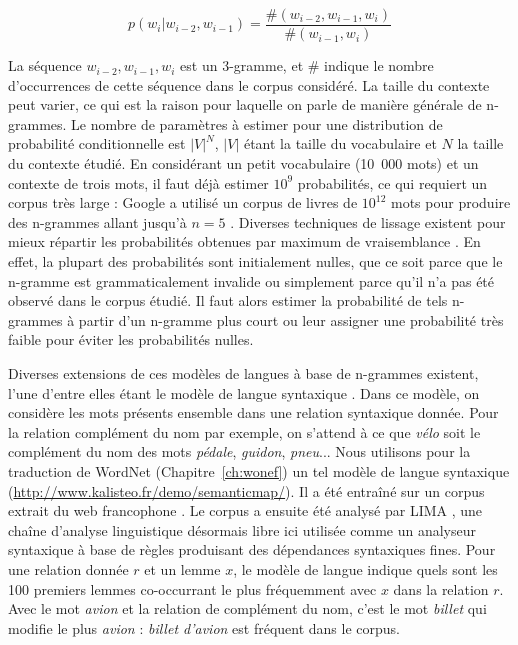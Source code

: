 \[
p(w_i|w_{i-2}, w_{i-1}) = \frac{\#(w_{i-2}, w_{i-1}, w_i)}{\#(w_{i-1}, w_i)}
\]

La séquence $w_{i-2}, w_{i-1}, w_{i}$ est un 3-gramme, et $\#$ indique le
nombre d'occurrences de cette séquence dans le corpus considéré. La taille du
contexte peut varier, ce qui est la raison pour laquelle on parle de manière
générale de n-grammes. Le nombre de paramètres à estimer pour une distribution
de probabilité conditionnelle est $|V|^N$, $|V|$ étant la taille du vocabulaire
et $N$ la taille du contexte étudié. En considérant un petit vocabulaire
(10~000 mots) et un contexte de trois mots, il faut déjà estimer $10^{9}$
probabilités, ce qui requiert un corpus très large : Google a utilisé un corpus
de livres de $10^{12}$ mots pour produire des n-grammes allant jusqu'à $n=5$
\citep{brants2006web}. Diverses techniques de lissage existent pour mieux
répartir les probabilités obtenues par maximum de vraisemblance
\citep[Chapitre~4]{jurafsky2008speech}. En effet, la plupart des probabilités
sont initialement nulles, que ce soit parce que le n-gramme est
grammaticalement invalide ou simplement parce qu'il n'a pas été observé dans le
corpus étudié. Il faut alors estimer la probabilité de tels n-grammes à partir
d'un n-gramme plus court ou leur assigner une probabilité très faible pour
éviter les probabilités nulles.

Diverses extensions de ces modèles de langues à base de n-grammes existent,
l'une d'entre elles étant le modèle de langue syntaxique
\citep{lin1998automatic,goldberg2013dataset}. Dans ce modèle, on considère les
mots présents ensemble dans une relation syntaxique donnée. Pour la relation
complément du nom par exemple, on s'attend à ce que \emph{vélo} soit le
complément du nom des mots \emph{pédale}, \emph{guidon}, \emph{pneu}... Nous
utilisons pour la traduction de WordNet (Chapitre~\ref{ch:wonef}) un tel modèle
de langue syntaxique (\url{http://www.kalisteo.fr/demo/semanticmap/}).  Il a
été entraîné sur un corpus extrait du web francophone
\citep{grefenstette2007conquering}. Le corpus a ensuite été analysé par LIMA
\citep{besancon2010lima}, une chaîne d'analyse linguistique désormais libre ici
utilisée comme un analyseur syntaxique à base de règles produisant des
dépendances syntaxiques fines. Pour une relation donnée $r$ et un lemme $x$, le
modèle de langue indique quels sont les 100 premiers lemmes co-occurrant le
plus fréquemment avec $x$ dans la relation $r$.  Avec le mot \textit{avion} et
la relation de complément du nom, c'est le mot \textit{billet} qui modifie le
plus \textit{avion} : \textit{billet d'avion} est fréquent dans le corpus.


